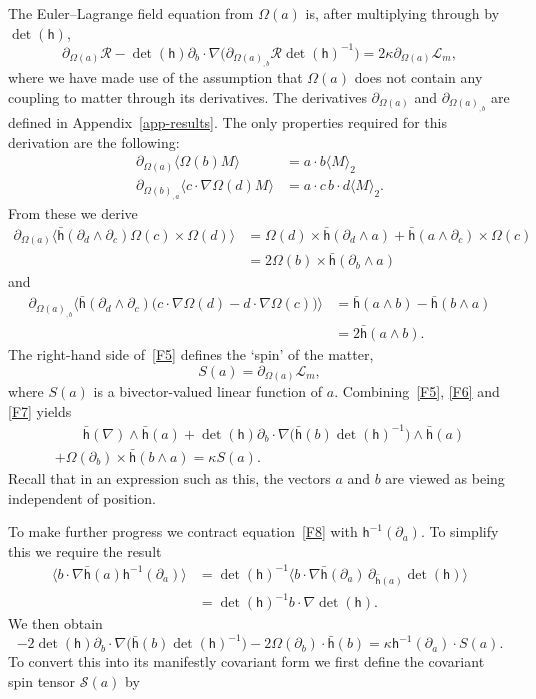 \documentclass[a4paper]{article}
\numberwithin{equation}{section}
\newcommand{\nn}{\nonumber}
\newcommand{\dt}{\! \cdot \!}
\newcommand{\wdg}{\! \wedge \!}
\newcommand{\crs}{\! \times \!}
\newcommand{\la}{\langle}
\newcommand{\ra}{\rangle}
\newcommand{\eqv}{=}
\newcommand{\kap}{\kappa}
\newcommand{\Om}{\Omega}
\newcommand{\cll}{{\mathcal{L}}}
\newcommand{\clr}{{\mathcal{R}}}
\newcommand{\cls}{{\mathcal{S}}}
\newcommand{\da}{\partial_a}
\newcommand{\db}{\partial_b}
\newcommand{\dc}{\partial_c}
\newcommand{\dd}{\partial_d}
\newcommand{\lih}{\mathsf{h}}
\newcommand{\lbh}{\bar{\mathsf{h}}}
\newcommand{\ho}{\lbh}
\newcommand{\hu}{\lih}
\newcommand{\grad}{\nabla}
\newcommand{\dhi}{\det(\hu)^{-1}}
\renewcommand{\dh}{\det(\hu)}
\newcommand{\dhoa}{\partial_{\ho(a)}}
\begin{document}
The Euler--Lagrange field equation from $\Om(a)$ is, after multiplying
through by $\dh$,
%
\begin{equation}
\partial_{\Omega(a)} \clr - \dh \db\dt\grad \bigl( \partial_{\Omega(a)_{,b}}
\clr \dhi \bigr) = 2\kappa \partial_{\Omega(a)} \cll_m,
\label{F5}
\end{equation}   
%
where we have made use of the assumption that $\Om(a)$ does not
contain any coupling to matter through its derivatives.  The
derivatives $\partial_{\Omega(a)}$ and $\partial_{\Omega(a)_{,b}}$ are
defined in Appendix~\ref{app-results}.  The only properties required
for this derivation are the following:
%
\begin{align}
\partial_{\Omega(a)} \la \Omega(b)M \ra &= a \dt b \la M \ra_2 \\
\partial_{\Omega(b)_{,a}} \la c \dt \grad \Omega(d) M \ra 
&=  a \dt c \, b \dt d  \la M \ra_2.
\end{align}
%
From these we derive
%
\begin{align}
\partial_{\Omega(a)} \la \ho(\dd \wdg \dc) \Om(c) \crs \Om(d) \ra 
&= \Om(d) \crs \ho(\dd \wdg a) + \ho(a \wdg \dc) \crs \Om(c) \nn \\
&= 2 \Om(b) \crs \ho(\db \wdg a) 
\label{F6}
\end{align}
%
and
%
\begin{align} 
\partial_{\Omega(a)_{,b}} \big\la \ho(\dd \wdg \dc) \bigl( c\dt\grad \Om(d) -
d\dt\grad \Om(c) \bigr) \big\ra &= \ho(a \wdg b) - \ho( b \wdg
a) \nn \\ 
&= 2 \ho(a \wdg b).
\label{F7}
\end{align}  
%
The right-hand side of~\eqref{F5} defines the `spin' of the matter, 
%
\begin{equation}
S(a) \eqv \partial_{\Omega(a)} \cll_m,
\end{equation} 
%
where $S(a)$ is a bivector-valued linear function of $a$. 
Combining~\eqref{F5}, \eqref{F6} and \eqref{F7} yields
%
\begin{multline}
\qquad \ho(\grad) \wdg \ho(a) + \dh \db \dt \grad \bigl( \ho(b)
\dhi \bigr) \wdg \ho(a) \\ 
+ \Om(\db) \crs \ho(b \wdg a) = \kap S(a). \qquad
\label{F8}
\end{multline} 
%
Recall that in an expression such as this, the vectors $a$ and $b$ are
viewed as being independent of position.  


To make further progress we contract equation~\eqref{F8} with
$\hu^{-1}(\da)$.  To simplify this we require the result
%
\begin{align}
\la b\dt\grad \ho(a) \hu^{-1}(\da) \ra &= \dhi \la  b\dt\grad \ho(\da)
\, \dhoa \dh \ra \nn \\
&= \dhi  b\dt\grad \dh.
\end{align} 
%
We then obtain
%
\begin{equation}
-2  \dh \db \dt \grad \bigl( \ho(b)
\dhi \bigr) -2 \Om(\db) \dt \ho(b) = \kap \hu^{-1}(\da) \dt S(a).
\end{equation}
%
To convert this into its manifestly covariant form we first define the
covariant spin tensor $\cls(a)$ by
\end{document}
